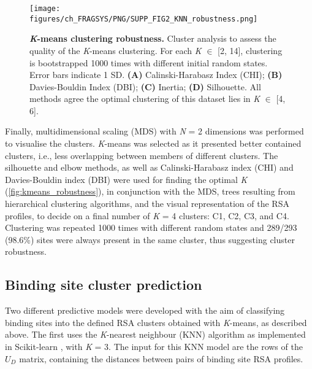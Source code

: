 \begin{figure}[ht!]
    \centering
    \texttt{[image: figures/ch\_FRAGSYS/PNG/SUPP\_FIG2\_KNN\_robustness.png]}
    \caption[\textit{K}-means clustering robustness]{\textbf{\textit{K}-means clustering robustness.} Cluster analysis to assess the quality of the \textit{K}-means clustering. For each \textit{K} $\in$ [2, 14], clustering is bootstrapped 1000 times with different initial random states. Error bars indicate 1 SD. \textbf{(A)} Calinski-Harabasz Index (CHI); \textbf{(B)} Davies-Bouldin Index (DBI); \textbf{(C)} Inertia; \textbf{(D)} Silhouette. All methods agree the optimal clustering of this dataset lies in \textit{K} $\in$ [4, 6].}
    \label{fig:kmeans_robustness}
\end{figure}

Finally, multidimensional scaling (MDS) \cite{MEAD_1992_MDS} with \textit{N} = 2 dimensions was performed to visualise the clusters. \textit{K}-means was selected as it presented better contained clusters, i.e., less overlapping between members of different clusters. The silhouette \cite{ROUSSEEUW_1987_SILHOUETTES} and elbow \cite{THORNDIKE_1953_ELBOW} methods, as well as Calinski-Harabasz index (CHI) \cite{CALINSKI_1974_CHI} and Davies-Bouldin index (DBI) \cite{DAVIES_1979_DBI} were used for finding the optimal \textit{K} (\autoref{fig:kmeans_robustness}), in conjunction with the MDS, trees resulting from hierarchical clustering algorithms, and the visual representation of the RSA profiles, to decide on a final number of \textit{K} = 4 clusters: C1, C2, C3, and C4. Clustering was repeated 1000 times with different random states and 289/293 (98.6\%) sites were always present in the same cluster, thus suggesting cluster robustness.

\subsection{Binding site cluster prediction}

Two different predictive models were developed with the aim of classifying binding sites into the defined RSA clusters obtained with \textit{K}-means, as described above. The first  uses the \textit{K}-nearest neighbour (KNN) algorithm as implemented in Scikit-learn \cite{PEDREGOSA_2011_SKLEARN}, with \textit{K} = 3. The input for this KNN model are the rows of the $U_{D}$ matrix, containing the distances between pairs of binding site RSA profiles.

